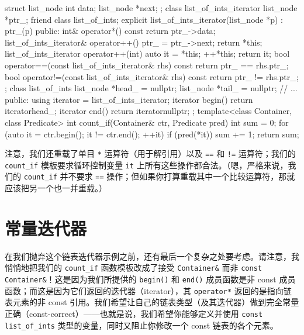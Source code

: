 \begin{codebox}[cpp]
    struct list_node {
      int data;
      list_node *next;
    };
    class list_of_ints_iterator {
      list_node *ptr_;
      friend class list_of_ints;
      explicit list_of_ints_iterator(list_node *p) : ptr_(p) {}
    public:
      int& operator*() const { return ptr_->data; }
      list_of_ints_iterator& operator++() { ptr_ = ptr_->next; return
*this; }
      list_of_ints_iterator operator++(int) { auto it = *this; ++*this;
return it; }
      bool operator==(const list_of_ints_iterator& rhs) const
        { return ptr_ == rhs.ptr_; }
      bool operator!=(const list_of_ints_iterator& rhs) const
        { return ptr_ != rhs.ptr_; }
    };
    class list_of_ints {
      list_node *head_ = nullptr;
      list_node *tail_ = nullptr;
      // ...
    public:
      using iterator = list_of_ints_iterator;
      iterator begin() { return iterator{head_}; }
      iterator end() { return iterator{nullptr}; }
    };
    template<class Container, class Predicate>
    int count_if(Container& ctr, Predicate pred)
    {
      int sum = 0;
      for (auto it = ctr.begin(); it != ctr.end(); ++it) {
        if (pred(*it)) {
            sum += 1;
        }
      }
      return sum;
   }
\end{codebox}

注意，我们还重载了单目 \texttt{*} 运算符（用于解引用）以及 \texttt{==} 和 \texttt{!=} 运算符；我们的 \texttt{count\_\allowbreak{}if} 模板要求循环控制变量 \texttt{it} 上所有这些操作都合法。（嗯，严格来说，我们的 \texttt{count\_\allowbreak{}if} 并不要求 \texttt{==} 操作；但如果你打算重载其中一个比较运算符，那就应该把另一个也一并重载。）

\section{常量迭代器}

在我们抛弃这个链表迭代器示例之前，还有最后一个复杂之处要考虑。请注意，我悄悄地把我们的 \texttt{count\_\allowbreak{}if} 函数模板改成了接受 \texttt{Container\&} 而非 \texttt{const Container\&}！这是因为我们所提供的 \texttt{begin(\allowbreak{})\allowbreak{}} 和 \texttt{end(\allowbreak{})\allowbreak{}} 成员函数是非 const 成员函数；而这是因为它们返回的迭代器（iterator），其 \texttt{operator*} 返回的是指向链表元素的非 const 引用。我们希望让自己的链表类型（及其迭代器）做到完全常量正确（const-correct）——也就是说，我们希望你能够定义并使用 \texttt{const list\_\allowbreak{}of\_\allowbreak{}ints} 类型的变量，同时又阻止你修改一个 const 链表的各个元素。

